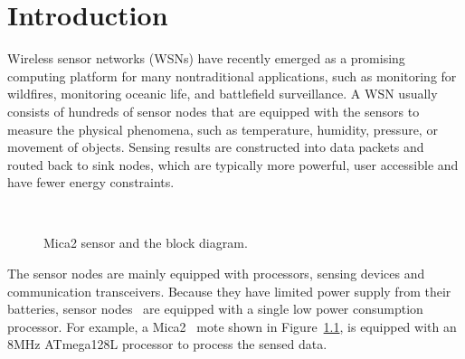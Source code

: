 \chapter{Introduction}\label{chap:intro}


Wireless sensor networks (WSNs) have recently emerged as a promising computing platform for many nontraditional applications, such as monitoring for wildfires, monitoring oceanic life, and battlefield surveillance. A WSN usually consists of hundreds of sensor nodes that are equipped with the sensors to measure the physical phenomena, such as temperature, humidity, pressure, or movement of objects. Sensing results are constructed into data packets and routed back to sink nodes, which are typically more powerful, user accessible and have fewer energy constraints.

\begin{figure}[h]
\centering
\mbox{
}
\caption{Mica2 sensor and the block diagram.}
\label{fig:mica2}
\end{figure}

The sensor nodes are mainly equipped with processors, sensing devices and communication transceivers. Because they have limited power supply from their batteries, sensor nodes~\cite{mica2-power, micaz-power,telos,telosb} are equipped with a single low power consumption processor. 
For example, a Mica2~\cite{mica2-power} mote shown in Figure~\ref{fig:mica2}, is equipped with an 8MHz ATmega128L processor to process the sensed data.

